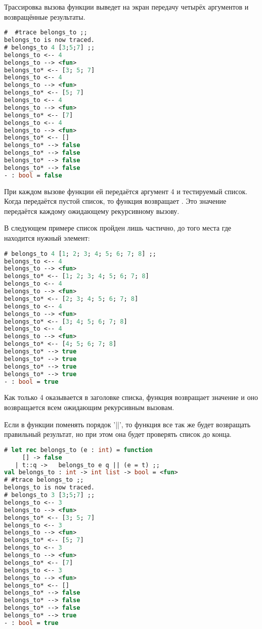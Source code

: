 Трассировка вызова функции  выведет на экран 
передачу четырёх аргументов и возвращённые результаты.

\begin{lstlisting}[language=OCaml]
#  #trace belongs_to ;;
belongs_to is now traced.
# belongs_to 4 [3;5;7] ;;
belongs_to <-- 4
belongs_to --> <fun>
belongs_to* <-- [3; 5; 7]
belongs_to <-- 4
belongs_to --> <fun>
belongs_to* <-- [5; 7]
belongs_to <-- 4
belongs_to --> <fun>
belongs_to* <-- [7]
belongs_to <-- 4
belongs_to --> <fun>
belongs_to* <-- []
belongs_to* --> false
belongs_to* --> false
belongs_to* --> false
belongs_to* --> false
- : bool = false
\end{lstlisting}

При каждом вызове функции  ей передаётся аргумент 4 и 
тестируемый список. Когда передаётся пустой список, то функция возвращает 
. Это значение передаётся каждому ожидающему рекурсивному вызову.

В следующем примере список пройден лишь частично, до того места где находится 
нужный элемент:

\begin{lstlisting}[language=OCaml]
# belongs_to 4 [1; 2; 3; 4; 5; 6; 7; 8] ;;
belongs_to <-- 4
belongs_to --> <fun>
belongs_to* <-- [1; 2; 3; 4; 5; 6; 7; 8]
belongs_to <-- 4
belongs_to --> <fun>
belongs_to* <-- [2; 3; 4; 5; 6; 7; 8]
belongs_to <-- 4
belongs_to --> <fun>
belongs_to* <-- [3; 4; 5; 6; 7; 8]
belongs_to <-- 4
belongs_to --> <fun>
belongs_to* <-- [4; 5; 6; 7; 8]
belongs_to* --> true
belongs_to* --> true
belongs_to* --> true
belongs_to* --> true
- : bool = true
\end{lstlisting}

Как только 4 оказывается в заголовке списка, функция возвращает значение 
 и оно возвращается всем ожидающим рекурсивным вызовам.

Если в функции  поменять порядок '||', то функция все так же 
будет возвращать правильный результат, но при этом она будет проверять список 
до конца.

\begin{lstlisting}[language=OCaml]
# let rec belongs_to (e : int) = function 
     [] -> false
   | t::q ->   belongs_to e q || (e = t) ;;
val belongs_to : int -> int list -> bool = <fun>
# #trace belongs_to ;;
belongs_to is now traced.
# belongs_to 3 [3;5;7] ;;
belongs_to <-- 3
belongs_to --> <fun>
belongs_to* <-- [3; 5; 7]
belongs_to <-- 3
belongs_to --> <fun>
belongs_to* <-- [5; 7]
belongs_to <-- 3
belongs_to --> <fun>
belongs_to* <-- [7]
belongs_to <-- 3
belongs_to --> <fun>
belongs_to* <-- []
belongs_to* --> false
belongs_to* --> false
belongs_to* --> false
belongs_to* --> true
- : bool = true
\end{lstlisting}

